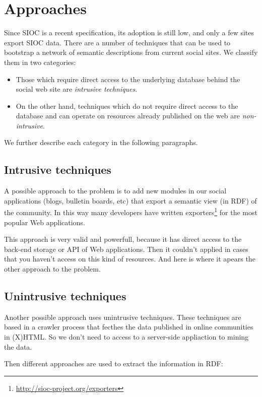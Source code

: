 \documentclass{../templates/www2008-submission}
\begin{document}
\section{Approaches}

Since SIOC is a recent specification, its adoption is still low, and
only a few sites export SIOC data. There are a number of techniques
that can be used to bootstrap a network of semantic descriptions from
current social sites. We classify them in two categories:

\begin{itemize}
\item Those which require direct access to the underlying database behind
the social web site are \emph{intrusive techniques}.
\item On the other hand, techniques which do not require direct access to
the database and can operate on resources already published on the web
are \emph{non-intrusive}.
\end{itemize}

We further describe each category in the following paragraphs.

\subsection{Intrusive techniques}

A possible approach to the problem is to add new modules in our
social applications (blogs, bulletin boards, etc) that export
a semantic view (in RDF) of the community. In this way many
developers have written exporters\footnote{\url{http://sioc-project.org/exporters}}
for the most popular Web applications.

This approach is very valid and powerfull, because it has direct 
access to the back-end storage or API of Web applications. Then it
couldn't applied in cases that you haven't access on this kind
of resources. And here is where it apears the other approach to
the problem.

\subsection{Unintrusive techniques}

Another possible approach uses unintrusive techniques. These 
techniques are based in a crawler process that fecthes the data 
published in online communities in (X)HTML. So we don't need to
access to a server-side appliaction to mining the data.

Then different approaches are used to extract the information 
in RDF:
\end{document}

